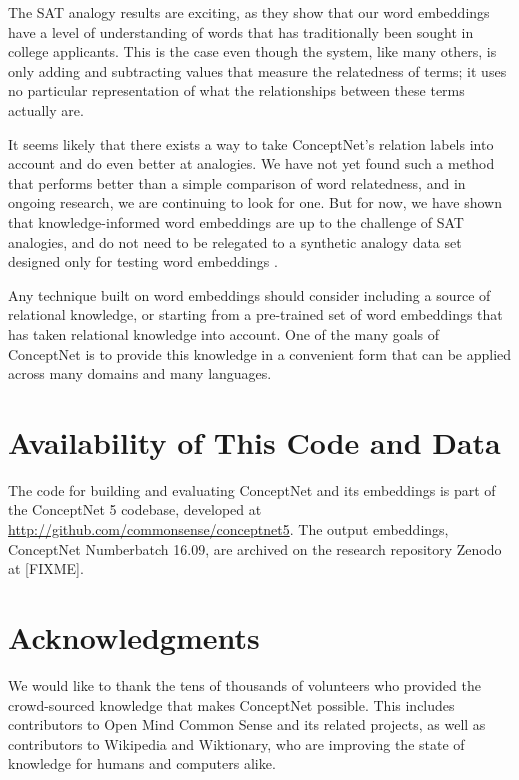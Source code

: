 \documentclass[letterpaper]{article}
\begin{document}
The SAT analogy results are exciting, as they show that our word embeddings
have a level of understanding of words that has traditionally been sought in
college applicants. This is the case even though the system, like many others,
is only adding and subtracting values that measure the relatedness of terms; it
uses no particular representation of what the relationships between these terms
actually are.


It seems likely that there exists a way to take ConceptNet's relation labels
into account and do even better at analogies. We have not yet found such a
method that performs better than a simple comparison of word relatedness, and
in ongoing research, we are continuing to look for one. But for now, we have
shown that knowledge-informed word embeddings are up to the challenge of SAT
analogies, and do not need to be relegated to a synthetic analogy data set
designed only for testing word embeddings \cite{mikolov2013word2vec}.

Any technique built on word embeddings should
consider including a source of relational knowledge, or starting from a
pre-trained set of word embeddings that has taken relational knowledge into
account. One of the many goals of ConceptNet is to provide this knowledge in a
convenient form that can be applied across many domains and many languages.


\section{Availability of This Code and Data}


The code for building and evaluating ConceptNet and its embeddings is part of
the ConceptNet 5 codebase, developed at \url{http://github.com/commonsense/conceptnet5}.
The output embeddings, ConceptNet Numberbatch 16.09, are archived on the research
repository Zenodo at [FIXME].

\section{Acknowledgments}

We would like to thank the tens of thousands of volunteers who provided the
crowd-sourced knowledge that makes ConceptNet possible. This includes
contributors to Open Mind Common Sense and its related projects, as well as
contributors to Wikipedia and Wiktionary, who are improving the state of
knowledge for humans and computers alike.



\end{document}
